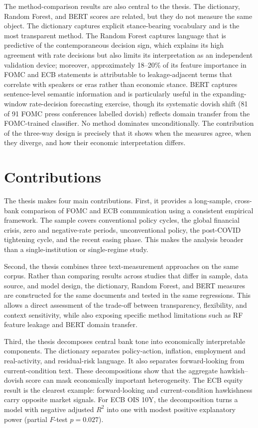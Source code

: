 The method-comparison results are also central to the thesis. The dictionary,
Random Forest, and BERT scores are related, but they do not measure the
same object. The dictionary captures explicit stance-bearing vocabulary and is
the most transparent method. The Random Forest captures language that is
predictive of the contemporaneous decision sign, which explains its high
agreement with rate decisions but also limits its interpretation as an
independent validation device; moreover, approximately 18--20\% of its feature
importance in FOMC and ECB statements is attributable to leakage-adjacent terms
that correlate with speakers or eras rather than economic stance. BERT
captures sentence-level semantic information and is particularly useful in the
expanding-window rate-decision forecasting exercise, though its systematic
dovish shift (81 of 91 FOMC press conferences labelled dovish) reflects domain
transfer from the FOMC-trained classifier. No method dominates unconditionally.
The contribution of the three-way design is precisely that it shows when the
measures agree, when they diverge, and how their economic interpretation differs.

\section{Contributions}
\label{sec:conc_contributions}

The thesis makes four main contributions. First, it provides a long-sample,
cross-bank comparison of FOMC and ECB communication using a consistent empirical
framework. The sample covers conventional policy cycles, the global financial
crisis, zero and negative-rate periods, unconventional policy, the post-COVID
tightening cycle, and the recent easing phase. This makes the analysis broader
than a single-institution or single-regime study.

Second, the thesis combines three text-measurement approaches on the same corpus.
Rather than comparing results across studies that differ in sample, data source,
and model design, the dictionary, Random Forest, and BERT measures are
constructed for the same documents and tested in the same regressions. This
allows a direct assessment of the trade-off between transparency, flexibility,
and context sensitivity, while also exposing specific method limitations such as
RF feature leakage and BERT domain transfer.

Third, the thesis decomposes central bank tone into economically interpretable
components. The dictionary separates policy-action, inflation, employment and
real-activity, and residual-risk language. It also separates forward-looking from
current-condition text. These decompositions show that the aggregate
hawkish--dovish score can mask economically important heterogeneity. The ECB
equity result is the clearest example: forward-looking and current-condition
hawkishness carry opposite market signals. For ECB OIS 10Y, the decomposition
turns a model with negative adjusted $R^2$ into one with modest positive
explanatory power (partial $F$-test $p=0.027$).

